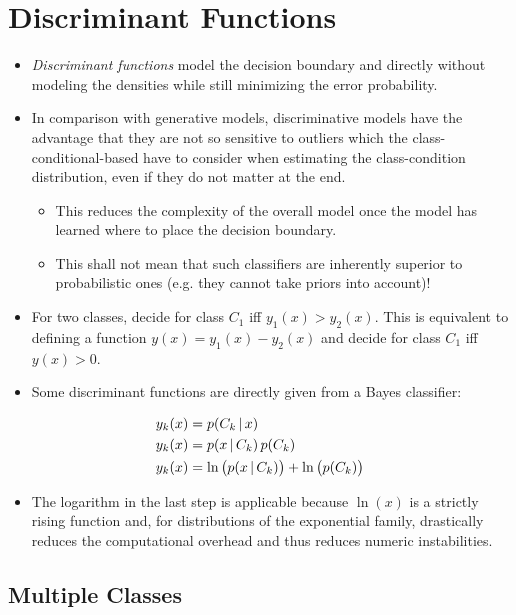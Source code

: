 	\section{Discriminant Functions}
		\begin{itemize}
			\item \emph{Discriminant functions} model the decision boundary and directly without modeling the densities while still minimizing the error probability.
			\item In comparison with generative models, discriminative models have the advantage that they are not so sensitive to outliers which the class-conditional-based have to consider when estimating the class-condition distribution, even if they do not matter at the end.
				\begin{itemize}
					\item This reduces the complexity of the overall model once the model has learned where to place the decision boundary.
					\item This shall not mean that such classifiers are inherently superior to probabilistic ones (e.g. they cannot take priors into account)!
				\end{itemize}
			\item For two classes, decide for class \(C_1\) iff \( y_1(x) > y_2(x) \). This is equivalent to defining a function \( y(x) = y_1(x) - y_2(x) \) and decide for class \(C_1\) iff \( y(x) > 0 \).
			\item Some discriminant functions are directly given from a Bayes classifier:
		\end{itemize}
		\begin{align}
			y_k(x) & = p(C_k \,\vert\, x)                                    \\
			y_k(x) & = p(x \,\vert\, C_k) \, p(C_k)                          \\
			y_k(x) & = \ln\big(p(x \,\vert\, C_k)\big) + \ln\big(p(C_k)\big)
		\end{align}
		\begin{itemize}
			\item[] The logarithm in the last step is applicable because \(\ln(x)\) is a strictly rising function and, for distributions of the exponential family, drastically reduces the computational overhead and thus reduces numeric instabilities.
		\end{itemize}

		\subsection{Multiple Classes}
			\label{sec:classificationMultiple}

